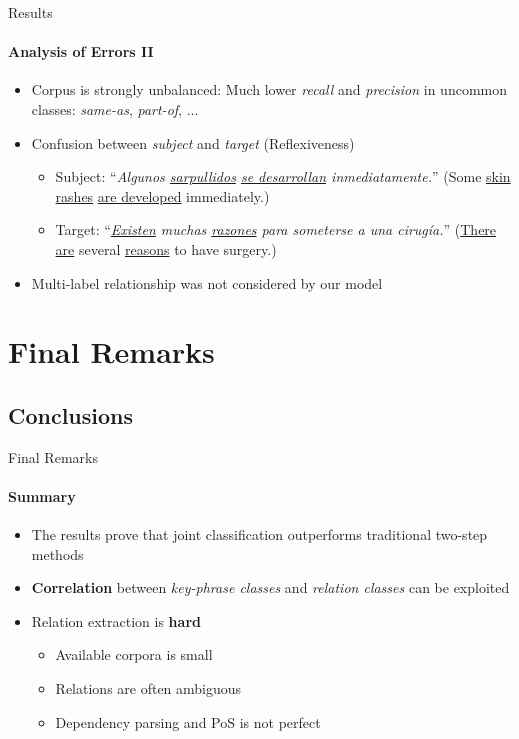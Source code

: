 \documentclass{beamer}
\begin{document}
\begin{frame}{Results}
\framesubtitle{Analysis of Errors II}
\begin{itemize}
    \item Corpus is strongly unbalanced: Much lower \emph{recall} and \emph{precision} in uncommon classes: \emph{same-as}, \emph{part-of}, ...
      \item Confusion between \emph{subject} and \emph{target} (Reflexiveness)
      \begin{itemize}
        \item \footnotesize Subject: ``\emph{Algunos \underline{sarpullidos} \underline{se desarrollan} inmediatamente.}'' (Some \underline{skin rashes} \underline{are developed} immediately.)
        \item Target: ``\emph{\underline{Existen} muchas \underline{razones} para someterse a una cirug\'{i}a.}'' (\underline{There are} several \underline{reasons} to have surgery.)
      \end{itemize}
      \item Multi-label relationship was not considered by our model
\end{itemize}
\end{frame}


%
%

\section{Final Remarks}

\subsection{Conclusions}

\begin{frame}{Final Remarks}
\framesubtitle{Summary}

\begin{itemize}
  \item The results prove that joint classification outperforms traditional two-step methods
  \item \textbf{Correlation} between \emph{key-phrase classes} and \emph{relation classes} can be exploited
  \item Relation extraction is \textbf{hard}
  \begin{itemize}
    \item Available corpora is small
    \item Relations are often ambiguous
    \item Dependency parsing and PoS is not perfect
  \end{itemize}
\end{itemize}
\end{frame}
\end{document}
